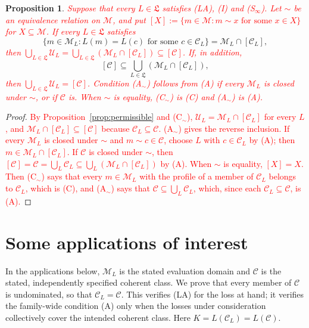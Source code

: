 \documentclass[11pt]{article}
\newtheorem{proposition}[theorem]{Proposition}
\theoremstyle{definition}
\theoremstyle{remark}
\newcommand{\M}{\mathcal M}
\newcommand{\C}{\mathcal C}
\newcommand{\U}{\mathcal U}
\begin{document}
\begin{proposition}\label{prop:permissible-equivalence}
\textcolor{red}{Suppose that every $L\in\mathfrak L$ satisfies (LA), (I) and (S$_\infty$). Let $\sim$ be an equivalence relation on $\M$, and put $[X]:=\{m\in\M:m\sim x\text{ for some }x\in X\}$ for $X\subseteq\M$. If every $L\in\mathfrak L$ satisfies}
\begin{equation}\tag{C$_\sim$}\label{eq:identification-equivalence}
 \{m\in\M_L:L(m)=L(c)\text{ for some }c\in\C_L\}
 =\M_L\cap[\C_L],
\end{equation}
\textcolor{red}{then $\bigcup_{L\in\mathfrak L}\U_L=\bigcup_{L\in\mathfrak L}(\M_L\cap[\C_L])\subseteq[\C]$. If, in addition,}
\begin{equation}\tag{A$_\sim$}\label{eq:equivalence-coverage}
 [\C]\subseteq\bigcup_{L\in\mathfrak L}(\M_L\cap[\C_L]),
\end{equation}
\textcolor{red}{then $\bigcup_{L\in\mathfrak L}\U_L=[\C]$. Condition (A$_\sim$) follows from (A) if every $\M_L$ is closed under $\sim$, or if $\C$ is. When $\sim$ is equality, (C$_\sim$) is (C) and (A$_\sim$) is (A).}
\end{proposition}
\begin{proof}
\textcolor{red}{By Proposition~\ref{prop:permissible} and (C$_\sim$), $\U_L=\M_L\cap[\C_L]$ for every $L$, and $\M_L\cap[\C_L]\subseteq[\C]$ because $\C_L\subseteq\C$. (A$_\sim$) gives the reverse inclusion. If every $\M_L$ is closed under $\sim$ and $m\sim c\in\C$, choose $L$ with $c\in\C_L$ by (A); then $m\in\M_L\cap[\C_L]$. If $\C$ is closed under $\sim$, then $[\C]=\C=\bigcup_L\C_L\subseteq\bigcup_L(\M_L\cap[\C_L])$ by (A). When $\sim$ is equality, $[X]=X$. Then (C$_\sim$) says that every $m\in\M_L$ with the profile of a member of $\C_L$ belongs to $\C_L$, which is (C), and (A$_\sim$) says that $\C\subseteq\bigcup_L\C_L$, which, since each $\C_L\subseteq\C$, is (A).}
\end{proof}


\newpage
\section{Some applications of interest}\label{sec:apps}
In the applications below, $\M_L$ is the stated evaluation domain and $\C$ is the stated, independently specified coherent class. We prove that every member of $\C$ is undominated, so that $\C_L=\C$. This verifies (LA) for the loss at hand; it verifies the family-wide condition (A) only when the losses under consideration collectively cover the intended coherent class. Here $K=L(\C_L)=L(\C)$.
\end{document}
